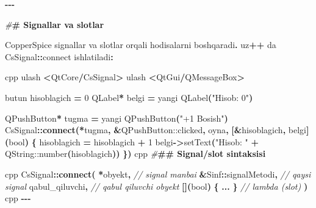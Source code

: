 \documentclass[a4paper,11pt,twoside,openright]{book}
\newenvironment{Shaded}{\begin{snugshade}}{\end{snugshade}}
\newcommand{\CommentTok}[1]{\textcolor[rgb]{0.56,0.35,0.01}{\textit{#1}}}
\newcommand{\DataTypeTok}[1]{\textcolor[rgb]{0.13,0.29,0.53}{#1}}
\newcommand{\DecValTok}[1]{\textcolor[rgb]{0.00,0.00,0.81}{#1}}
\newcommand{\ErrorTok}[1]{\textcolor[rgb]{0.64,0.00,0.00}{\textbf{#1}}}
\newcommand{\ExtensionTok}[1]{#1}
\newcommand{\FunctionTok}[1]{\textcolor[rgb]{0.13,0.29,0.53}{\textbf{#1}}}
\newcommand{\NormalTok}[1]{#1}
\newcommand{\OperatorTok}[1]{\textcolor[rgb]{0.81,0.36,0.00}{\textbf{#1}}}
\newcommand{\PreprocessorTok}[1]{\textcolor[rgb]{0.56,0.35,0.01}{\textit{#1}}}
\newcommand{\StringTok}[1]{\textcolor[rgb]{0.31,0.60,0.02}{#1}}
\begin{document}
\begin{Shaded}
\begin{Highlighting}[]
\OperatorTok{{-}{-}{-}}

\PreprocessorTok{\#}\ErrorTok{\# Signallar va slotlar}

\NormalTok{CopperSpice signallar va slotlar orqali hodisalarni boshqaradi}\OperatorTok{.}\NormalTok{ uz}\OperatorTok{++}\NormalTok{ da }\ErrorTok{\textasciigrave{}}\NormalTok{CsSignal}\OperatorTok{::}\NormalTok{connect}\ErrorTok{\textasciigrave{}}\NormalTok{ ishlatiladi}\OperatorTok{:}

\ErrorTok{\textasciigrave{}\textasciigrave{}\textasciigrave{}}\NormalTok{cpp}
\NormalTok{ulash }\OperatorTok{\textless{}}\NormalTok{QtCore}\OperatorTok{/}\NormalTok{CsSignal}\OperatorTok{\textgreater{}}
\NormalTok{ulash }\OperatorTok{\textless{}}\NormalTok{QtGui}\OperatorTok{/}\ExtensionTok{QMessageBox}\OperatorTok{\textgreater{}}

\NormalTok{butun hisoblagich }\OperatorTok{=} \DecValTok{0}
\ExtensionTok{QLabel}\OperatorTok{*}\NormalTok{ belgi }\OperatorTok{=}\NormalTok{ yangi }\ExtensionTok{QLabel}\OperatorTok{(}\StringTok{"Hisob: 0"}\OperatorTok{)}

\ExtensionTok{QPushButton}\OperatorTok{*}\NormalTok{ tugma }\OperatorTok{=}\NormalTok{ yangi }\ExtensionTok{QPushButton}\OperatorTok{(}\StringTok{"+1 Bosish"}\OperatorTok{)}
\NormalTok{CsSignal}\OperatorTok{::}\FunctionTok{connect}\OperatorTok{(*}\NormalTok{tugma}\OperatorTok{,} \OperatorTok{\&}\ExtensionTok{QPushButton::clicked}\OperatorTok{,}\NormalTok{ oyna}\OperatorTok{,} \OperatorTok{[\&}\NormalTok{hisoblagich}\OperatorTok{,}\NormalTok{ belgi}\OperatorTok{](}\DataTypeTok{bool}\OperatorTok{)} \OperatorTok{\{}
\NormalTok{    hisoblagich }\OperatorTok{=}\NormalTok{ hisoblagich }\OperatorTok{+} \DecValTok{1}
\NormalTok{    belgi}\OperatorTok{{-}\textgreater{}}\NormalTok{setText}\OperatorTok{(}\StringTok{"Hisob: "} \OperatorTok{+} \ExtensionTok{QString::number}\OperatorTok{(}\NormalTok{hisoblagich}\OperatorTok{))}
\OperatorTok{\})}
\ErrorTok{\textasciigrave{}\textasciigrave{}\textasciigrave{}}\NormalTok{cpp}
\PreprocessorTok{\#}\ErrorTok{\#\# Signal/slot sintaksisi}

\ErrorTok{\textasciigrave{}\textasciigrave{}\textasciigrave{}}\NormalTok{cpp}
\NormalTok{CsSignal}\OperatorTok{::}\FunctionTok{connect}\OperatorTok{(}
    \OperatorTok{*}\NormalTok{obyekt}\OperatorTok{,}                    \CommentTok{// signal manbai}
    \OperatorTok{\&}\NormalTok{Sinf}\OperatorTok{::}\NormalTok{signalMetodi}\OperatorTok{,}        \CommentTok{// qaysi signal}
\NormalTok{    qabul\_qiluvchi}\OperatorTok{,}             \CommentTok{// qabul qiluvchi obyekt}
    \OperatorTok{[](}\DataTypeTok{bool}\OperatorTok{)} \OperatorTok{\{} \OperatorTok{...} \OperatorTok{\}}            \CommentTok{// lambda (slot)}
\OperatorTok{)}
\ErrorTok{\textasciigrave{}\textasciigrave{}\textasciigrave{}}\NormalTok{cpp}
\OperatorTok{{-}{-}{-}}


\end{Highlighting}
\end{Shaded}
\end{document}
